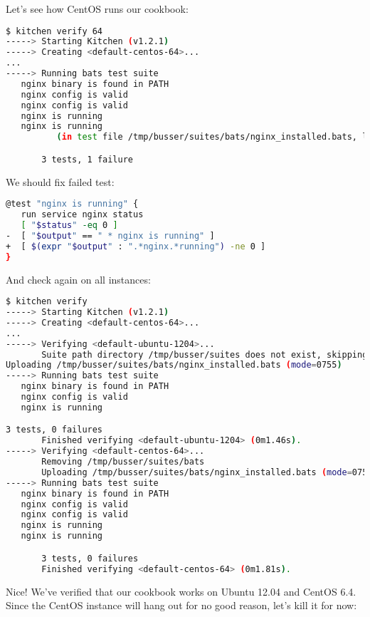 Let's see how CentOS runs our cookbook:

\begin{lstlisting}[language=Bash,label=lst:testing-test-kitchen22]
$ kitchen verify 64
-----> Starting Kitchen (v1.2.1)
-----> Creating <default-centos-64>...
...
-----> Running bats test suite
   nginx binary is found in PATH
   nginx config is valid                                                    2/3
   nginx config is valid
   nginx is running                                                         3/3
   nginx is running
          (in test file /tmp/busser/suites/bats/nginx_installed.bats, line 16)

       3 tests, 1 failure
\end{lstlisting}

We should fix failed test:

\begin{lstlisting}[language=Bash,label=lst:testing-test-kitchen23]
@test "nginx is running" {
   run service nginx status
   [ "$status" -eq 0 ]
-  [ "$output" == " * nginx is running" ]
+  [ $(expr "$output" : ".*nginx.*running") -ne 0 ]
}
\end{lstlisting}

And check again on all instances:

\begin{lstlisting}[language=Bash,label=lst:testing-test-kitchen24]
$ kitchen verify
-----> Starting Kitchen (v1.2.1)
-----> Creating <default-centos-64>...
...
-----> Verifying <default-ubuntu-1204>...
       Suite path directory /tmp/busser/suites does not exist, skipping.
Uploading /tmp/busser/suites/bats/nginx_installed.bats (mode=0755)
-----> Running bats test suite
   nginx binary is found in PATH
   nginx config is valid
   nginx is running

3 tests, 0 failures
       Finished verifying <default-ubuntu-1204> (0m1.46s).
-----> Verifying <default-centos-64>...
       Removing /tmp/busser/suites/bats
       Uploading /tmp/busser/suites/bats/nginx_installed.bats (mode=0755)
-----> Running bats test suite
   nginx binary is found in PATH
   nginx config is valid                                                    2/3
   nginx config is valid
   nginx is running                                                         3/3
   nginx is running

       3 tests, 0 failures
       Finished verifying <default-centos-64> (0m1.81s).
\end{lstlisting}

Nice! We've verified that our cookbook works on Ubuntu 12.04 and CentOS 6.4. Since the CentOS instance will hang out for no good reason, let's kill it for now:

